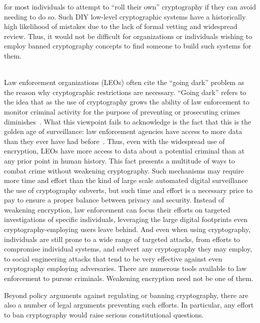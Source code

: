 \begin{packed_desc}
{    for most individuals to attempt to ``roll their own'' cryptography
    if they can avoid needing to do so. Such DIY low-level
    cryptographic systems have a historically high likelihood of
    mistakes due to the lack of formal vetting and widespread review.}
  Thus, it would not be difficult for organizations or individuals
  wishing to employ banned cryptography concepts to find someone to
  build such systems for them.
\item[Better Options] \hfill \\ Law enforcement organizations (LEOs)
  often cite the ``going dark'' problem as the reason why
  cryptographic restrictions are necessary. ``Going dark'' refers to
  the idea that as the use of cryptography grows the ability of law
  enforcement to monitor criminal activity for the purpose of
  preventing or prosecuting crimes
  diminishes~\cite{anderson2013}. What this viewpoint fails to
  acknowledge is the fact that this is the golden age of surveillance:
  law enforcement agencies have access to more data than they ever
  have had before~\cite{swire2011}. Thus, even with the widespread use
  of encryption, LEOs have more access to data about a potential
  criminal than at any prior point in human history. This fact
  presents a multitude of ways to combat crime without weakening
  cryptography. Such mechanisms may require more time and effort than
  the kind of large scale automated digital surveillance the use of
  cryptography subverts, but such time and effort is a necessary price
  to pay to ensure a proper balance between privacy and security.
  Instead of weakening encryption, law enforcement can focus their
  efforts on targeted investigations of specific individuals,
  leveraging the large digital footprints even cryptography-employing
  users leave behind. And even when using cryptography, individuals
  are still prone to a wide range of targeted attacks, from efforts to
  compromise individual systems, and subvert any cryptography they may
  employ, to social engineering attacks that tend to be very effective
  against even cryptography employing adversaries. There are numerous
  tools available to law enforcement to pursue criminals. Weakening
  encryption need not be one of them.
\end{packed_desc}

Beyond policy arguments against regulating or banning cryptography,
there are also a number of legal arguments preventing such efforts. In
particular, any effort to ban cryptography would raise serious
constitutional questions.

